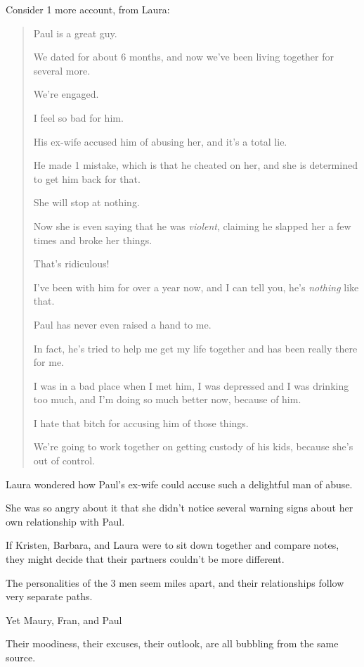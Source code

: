 \documentclass[oneside]{article}
\numberwithin{equation}{section}
\begin{document}
%
Consider 1 more account, from Laura:
\begin{quotation}
    Paul is a great guy.
    
    We dated for about 6 months, and now we've been living together for several more.
    
    We're engaged.
    
    I feel so bad for him.
    
    His ex-wife accused him of abusing her, and it's a total lie.
    
    He made 1 mistake, which is that he cheated on her, and she is determined to get him back for that.
    
    She will stop at nothing.
    
    Now she is even saying that he was \textit{violent}, claiming he slapped her a few times and broke her things.
    
    That's ridiculous!
    
    I've been with him for over a year now, and I can tell you, he's \textit{nothing} like that.
    
    Paul has never even raised a hand to me.
    
    In fact, he's tried to help me get my life together and has been really there for me.
    
    I was in a bad place when I met him, I was depressed and I was drinking too much, and I'm doing so much better now, because of him.
    
    I hate that bitch for accusing him of those things.
    
    We're going to work together on getting custody of his kids, because she's out of control.
\end{quotation}
Laura wondered how Paul's ex-wife could accuse such a delightful man of abuse.

She was so angry about it that she didn't notice several warning signs about her own relationship with Paul.

%
If Kristen, Barbara, and Laura were to sit down together and compare notes, they might decide that their partners couldn't be more different.

The personalities of the 3 men seem miles apart, and their relationships follow very separate paths.

Yet Maury, Fran, and Paul 

Their moodiness, their excuses, their outlook, are all bubbling from the same source.
\end{document}

